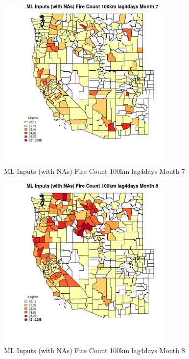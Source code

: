 \begin{figure} 
\centering  
\includegraphics[width=0.77\textwidth]{Code_Outputs/Report_ML_input_PM25_Step4_part_e_de_duplicated_aves_compiled_2019-05-21wNAs_CountyFire_Count_100km_lag4daysmedianMonth7.jpg} 
\caption{\label{fig:Report_ML_input_PM25_Step4_part_e_de_duplicated_aves_compiled_2019-05-21wNAsCountyFire_Count_100km_lag4daysmedianMonth7}ML Inputs (with NAs) Fire Count 100km lag4days Month 7} 
\end{figure} 
 

\begin{figure} 
\centering  
\includegraphics[width=0.77\textwidth]{Code_Outputs/Report_ML_input_PM25_Step4_part_e_de_duplicated_aves_compiled_2019-05-21wNAs_CountyFire_Count_100km_lag4daysmedianMonth8.jpg} 
\caption{\label{fig:Report_ML_input_PM25_Step4_part_e_de_duplicated_aves_compiled_2019-05-21wNAsCountyFire_Count_100km_lag4daysmedianMonth8}ML Inputs (with NAs) Fire Count 100km lag4days Month 8} 
\end{figure} 
 

